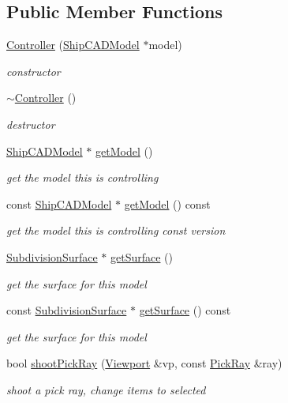 \subsection*{Public Member Functions}
\begin{DoxyCompactItemize}
\item 
\hyperlink{classShipCAD_1_1Controller_a969bc231a8d15189a717acbca9146deb}{Controller} (\hyperlink{classShipCAD_1_1ShipCADModel}{Ship\+C\+A\+D\+Model} $\ast$model)
\begin{DoxyCompactList}\small\item\em constructor \end{DoxyCompactList}\item 
\hyperlink{classShipCAD_1_1Controller_a9abfbe37b40e9862670746ef22a85d9d}{$\sim$\+Controller} ()
\begin{DoxyCompactList}\small\item\em destructor \end{DoxyCompactList}\item 
\hyperlink{classShipCAD_1_1ShipCADModel}{Ship\+C\+A\+D\+Model} $\ast$ \hyperlink{classShipCAD_1_1Controller_a7868a3bac4ed86abff1fe5a0fabb4abd}{get\+Model} ()
\begin{DoxyCompactList}\small\item\em get the model this is controlling \end{DoxyCompactList}\item 
const \hyperlink{classShipCAD_1_1ShipCADModel}{Ship\+C\+A\+D\+Model} $\ast$ \hyperlink{classShipCAD_1_1Controller_a0028a4ee8f47dd5e6de6d3d02e78b24e}{get\+Model} () const 
\begin{DoxyCompactList}\small\item\em get the model this is controlling const version \end{DoxyCompactList}\item 
\hyperlink{classShipCAD_1_1SubdivisionSurface}{Subdivision\+Surface} $\ast$ \hyperlink{classShipCAD_1_1Controller_a2c9451a5922f70710222d9b2cd37665c}{get\+Surface} ()
\begin{DoxyCompactList}\small\item\em get the surface for this model \end{DoxyCompactList}\item 
const \hyperlink{classShipCAD_1_1SubdivisionSurface}{Subdivision\+Surface} $\ast$ \hyperlink{classShipCAD_1_1Controller_ad8518ad3bb7e37cacad34f31045db3a4}{get\+Surface} () const 
\begin{DoxyCompactList}\small\item\em get the surface for this model \end{DoxyCompactList}\item 
bool \hyperlink{classShipCAD_1_1Controller_ae09ac41e86659fab53e236f27f2ca761}{shoot\+Pick\+Ray} (\hyperlink{classShipCAD_1_1Viewport}{Viewport} \&vp, const \hyperlink{structShipCAD_1_1PickRay}{Pick\+Ray} \&ray)
\begin{DoxyCompactList}\small\item\em shoot a pick ray, change items to selected \end{DoxyCompactList}\end{DoxyCompactItemize}
